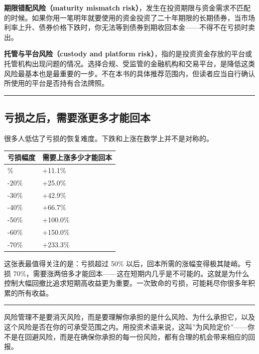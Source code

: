 \documentclass[a4paper,11pt,oneside,fontset=none,UTF8,zihao=-4]{ctexbook}
\begin{document}
\textbf{期限错配风险（maturity mismatch
risk）}，发生在投资期限与资金需求不匹配的时候。如果你用一笔明年就要使用的资金投资了二十年期限的长期债券，当市场利率上升、债券价格下跌时，你无法等到债券到期收回本金------不得不在亏损时卖出。

\textbf{托管与平台风险（custody and platform
risk）}，指的是投资资金存放的平台或托管机构出现问题的情况。选择合规、受监管的金融机构和交易平台，是降低这类风险最基本也是最重要的一步。不在本书的具体推荐范围内，但读者应当自行确认所使用的平台是否持有合法牌照。

\begin{center}{\color{dh-bronze}\rule{0.2\textwidth}{0.5pt}}\end{center}

\subsection{亏损之后，需要涨更多才能回本}\label{ux4e8fux635fux4e4bux540eux9700ux8981ux6da8ux66f4ux591aux624dux80fdux56deux672c}

很多人低估了亏损的恢复难度。下跌和上涨在数学上并不是对称的。

\begin{longtable}[]{@{}ll@{}}
\toprule\noalign{}\rowcolor{dh-pink!25}
亏损幅度 & 需要上涨多少才能回本 \\
\midrule\noalign{}
\endhead
\bottomrule\noalign{}
\endlastfoot
-10\% & +11.1\% \\
-20\% & +25.0\% \\
-30\% & +42.9\% \\
-40\% & +66.7\% \\
-50\% & +100.0\% \\
-60\% & +150.0\% \\
-70\% & +233.3\% \\
\end{longtable}

这张表最值得关注的是：亏损超过 50\%
以后，回本所需的涨幅变得极其陡峭。亏损
70\%，需要涨两倍多才能回本------这在短期内几乎是不可能的。这就是为什么控制大幅回撤比追求短期高收益更为重要。一次致命的亏损，可能耗尽你很多年积累的所有收益。

\begin{center}{\color{dh-bronze}\rule{0.2\textwidth}{0.5pt}}\end{center}

风险管理不是要消灭风险，而是要理解你承担的是什么风险、为什么承担它，以及这个风险是否在你的可承受范围之内。用投资术语来说，这叫''为风险定价''------你不是在回避风险，而是在确保你承担的每一份风险，都有合理的机会带来相应的回报。
\end{document}
